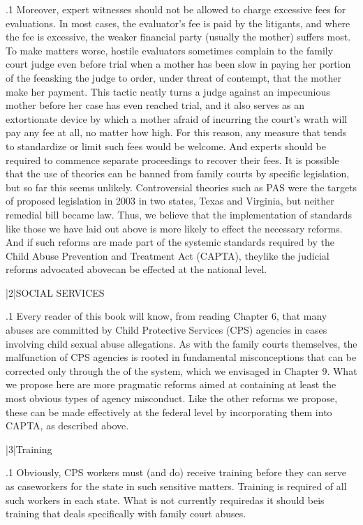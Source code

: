 \documentclass[11pt, twoside]{article}
\begin{document}
{\p.1{%
Moreover, expert witnesses should not be allowed to charge excessive fees for evaluations. In most cases, the evaluator’s fee is paid by the
litigants, and where the fee is excessive, the weaker financial party (usually the mother) suffers most. To make matters worse, hostile evaluators
sometimes complain to the family court judge even before trial when a
mother has been slow in paying her portion of the fee\mdash{}asking the judge
to order, under threat of contempt, that the mother make her payment.
This tactic neatly turns a judge against an impecunious mother before
her case has even reached trial, and it also serves as an extortionate device by which a mother afraid of incurring the court’s wrath will pay any
fee at all, no matter how high. For this reason, any measure that tends
to standardize or limit such fees would be welcome. And experts should
be required to commence separate proceedings to recover their fees.
It is possible that the use of  theories can be banned
from family courts by specific legislation, but so far this seems unlikely.
Controversial theories such as PAS were the targets of proposed legislation in 2003 in two states, Texas and Virginia, but neither remedial bill
became law. Thus, we believe that the implementation of standards like
those we have laid out above is more likely to effect the necessary reforms. And
if such reforms are made part of the systemic standards required by the
Child Abuse Prevention and Treatment Act (CAPTA), they\mdash{}like the judicial
reforms advocated above\mdash{}can be effected at the national
level.
}%


\s|2|{SOCIAL SERVICES}

\p.1{%
\noindent{}Every reader of this book will know, from reading Chapter 6, that many
abuses are committed by Child Protective Services (CPS) agencies in
cases involving child sexual abuse allegations. As with the family courts
themselves, the malfunction of CPS agencies is rooted in fundamental
misconceptions that can be corrected only through the  of
the system, which we envisaged in Chapter 9. What we propose here are
more pragmatic reforms aimed at containing at least the most obvious
types of agency misconduct. Like the other reforms we propose, these
can be made effectively at the federal level by incorporating them into
CAPTA, as described above.
}%


\s|3|{Training}

\p.1{%
\noindent{}Obviously, CPS workers must (and do) receive training before they can
serve as caseworkers for the state in such sensitive matters. Training
is required of all such workers in each state. What is not currently
required\mdash{}as it should be\mdash{}is training that deals specifically with family
court abuses.
}%

}
\end{document}
